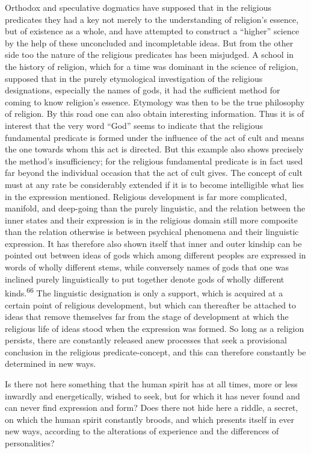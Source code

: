 \documentclass[12pt,a4paper]{book}
\newcommand{\opage}[1]{\marginnote{\footnotesize\textit{[#1]}}}
\begin{document}
Orthodox and speculative dogmatics have supposed that in the religious predicates they had a key
not merely to the understanding of religion's essence, but of existence as a whole, and have
attempted to construct a ``higher'' science by the help of these unconcluded and incompletable
ideas. But from the other side too the nature of the religious predicates has been misjudged. A
school in the history of religion, which for a time was dominant in the science of religion,
supposed that in the purely etymological investigation of the religious designations, especially
the names of gods, it had the sufficient method for coming to know religion's essence. Etymology
was then to be the true philosophy of religion. By this road one can also obtain interesting
information. Thus it is of interest that the very word ``God'' seems to indicate that the
religious fundamental predicate is formed under the influence of the act of cult and means the
one towards whom this act is directed. But this example also shows precisely the method's
insufficiency; for the religious fundamental predicate is in fact used far beyond the individual
occasion that the act of cult gives. The concept of cult must at any rate be considerably
extended if it is to become intelligible what lies in the expression mentioned. Religious
development is far more complicated, manifold, and deep-going than the purely linguistic, and the
relation between the inner states and their expression is in the religious domain still more
composite than the relation otherwise is between psychical phenomena and their linguistic
expression. It has therefore also shown itself that inner and outer kinship can be pointed out
between ideas of gods which among different peoples are expressed in words of wholly different
stems, while conversely names of gods that one was inclined purely linguistically to put together
denote gods of wholly different kinds.\textsuperscript{66} The linguistic designation is only a
support, which is acquired at a certain point of religious development, but which can thereafter
be attached to ideas that remove themselves far from the stage of development at which the
religious life of ideas stood when the expression was formed. So long as a religion persists,
there are constantly released anew processes that seek a provisional conclusion in the religious
predicate-concept, and this can therefore constantly be determined in new ways.

Is there not here something that the human spirit has at all times, more or less inwardly and
energetically, wished to seek, 
\opage{126}but for which it has never found and can never find expression and
form? Does there not hide here a riddle, a secret, on which the human spirit constantly broods,
and which presents itself in ever new ways, according to the alterations of experience and the
differences of personalities?
\end{document}
